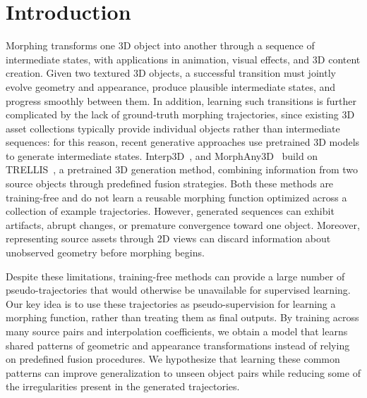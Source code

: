 \section{Introduction}
\label{sec:introduction}

Morphing transforms one 3D object into another through a sequence of intermediate states, with applications in animation, visual effects, and 3D content creation. Given two textured 3D objects, a successful transition must jointly evolve geometry and appearance, produce plausible intermediate states, and progress smoothly between them. %
In addition, learning such transitions is further complicated by the lack of ground-truth morphing trajectories, since existing 3D asset collections typically provide individual objects rather than intermediate sequences: for this reason, recent generative approaches use pretrained 3D models to generate intermediate states.
Interp3D~\cite{liu2026interp3d}, and MorphAny3D~\cite{sun2026morphany3d} build on TRELLIS~\cite{xiang2025trellis}, a pretrained 3D generation method, combining information from two source objects through predefined fusion strategies. Both these methods are training-free and do not learn a reusable morphing function optimized across a collection of example trajectories. However, generated sequences can exhibit artifacts, abrupt changes, or premature convergence toward one object. Moreover, representing source assets through 2D views can discard information about unobserved geometry
before morphing begins. %

Despite these limitations, training-free methods can provide a large number of pseudo-trajectories that would otherwise be unavailable for supervised learning. Our key idea is to use these trajectories as pseudo-supervision for learning a morphing function, rather than treating them as final outputs. By training across many source pairs and interpolation coefficients, we obtain a model that learns shared patterns of geometric and appearance transformations instead of relying on predefined fusion procedures. We hypothesize that learning these common patterns can improve generalization to unseen object pairs while reducing some of the irregularities present in the generated trajectories. %

